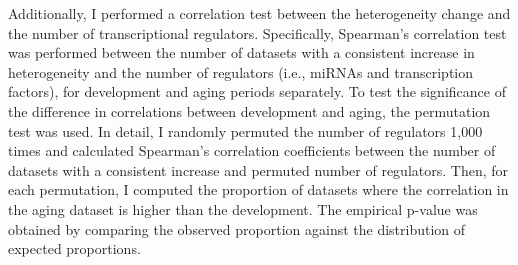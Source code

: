 Additionally, I performed a correlation test between the heterogeneity change and the number of transcriptional regulators. 
Specifically, Spearman's correlation test was performed between the number of datasets with a consistent increase in heterogeneity and 
the number of regulators (i.e., miRNAs and transcription factors), for development and aging periods separately. 
To test the significance of the difference in correlations between development and aging, the permutation test was used.
In detail, I randomly permuted the number of regulators 1,000 times and 
calculated Spearman's correlation coefficients between the number of datasets with a consistent increase and permuted number of regulators.
Then, for each permutation, I computed the proportion of datasets where the correlation in the aging dataset is higher than the development.
The empirical p-value was obtained by comparing the observed proportion against the distribution of expected proportions.
